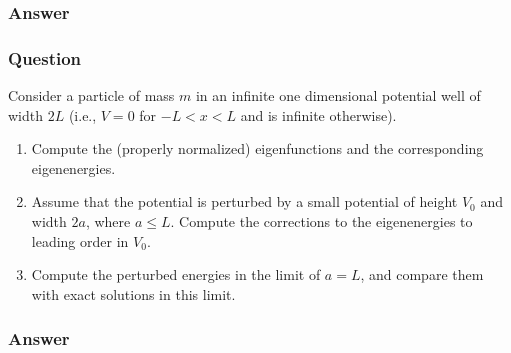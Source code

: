 \subsubsection{Answer}



\subsubsection{Question}
Consider a particle of mass $m$ in an infinite one dimensional potential well of width $2L$ (i.e., $V=0$ for $-L<x<L$ and is infinite otherwise).
\begin{enumerate}
	\item Compute the (properly normalized) eigenfunctions and the corresponding eigenenergies.
	\item Assume that the potential is perturbed by a small potential of height $V_0$ and width $2a$, where $a\le L$. Compute the corrections to the eigenenergies to leading order in $V_0$.
	\item Compute the perturbed energies in the limit of $a=L$, and compare them with exact solutions in this limit. 
\end{enumerate}
\subsubsection{Answer}



